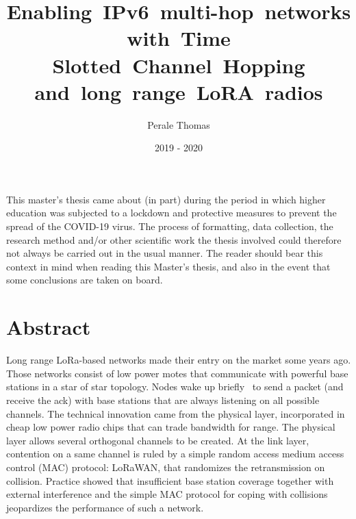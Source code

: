 \documentclass[11pt]{report}
\title{Enabling~IPv6~multi-hop~networks with~Time Slotted~Channel~Hopping and~long~range~LoRA~radios}
\author{Perale Thomas}
\date{2019 - 2020}
\begin{document}
\maketitle



\clearpage
\vspace*{\fill}
\begin{center}
\begin{minipage}{.6\textwidth}
This master's thesis came about (in part) during the period in which higher
education was subjected to a lockdown and protective measures to prevent
the spread of the COVID-19 virus. The process of formatting, data
collection, the research method and/or other scientific work the thesis
involved could therefore not always be carried out in the usual manner. The
reader should bear this context in mind when reading this Master's thesis, and
also in the event that some conclusions are taken on board.
\end{minipage}
\end{center}
\vfill %
\clearpage

\newpage

\section*{Abstract}

Long range LoRa-based networks made their entry on the market some years ago.
Those networks consist of low power motes that communicate with powerful base
stations in a star of star topology.
Nodes wake up briefly  to send a packet (and receive the ack) with base
stations that are always listening on all possible channels.
The technical innovation came from the physical layer, incorporated in cheap
low power radio chips that can trade bandwidth for range.
The physical layer allows several orthogonal channels to be created.
At the link layer, contention on a same channel is ruled by a simple random
access medium access control (MAC) protocol: LoRaWAN,
that randomizes the retransmission on collision.
Practice showed that insufficient base station coverage together with external
interference and the simple MAC protocol for coping with collisions
jeopardizes the performance of such a network.
\end{document}
